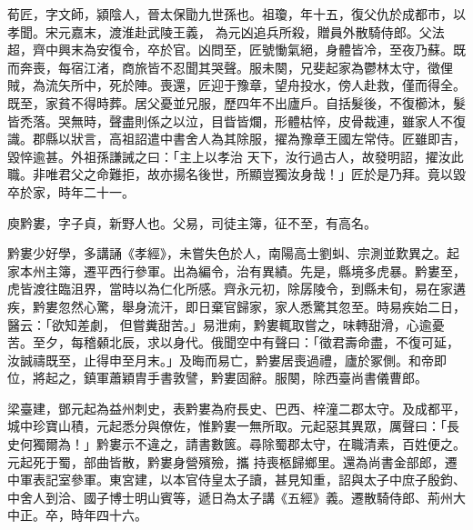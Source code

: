 \begin{pinyinscope}
 荀匠，字文師，潁陰人，晉太保勖九世孫也。祖瓊，年十五，復父仇於成都市，以孝聞。宋元嘉末，渡淮赴武陵王義，
 為元凶追兵所殺，贈員外散騎侍郎。父法超，齊中興末為安復令，卒於官。凶問至，匠號慟氣絕，身體皆冷，至夜乃蘇。既而奔喪，每宿江渚，商旅皆不忍聞其哭聲。服未闋，兄斐起家為鬱林太守，徵俚賊，為流矢所中，死於陣。喪還，匠迎于豫章，望舟投水，傍人赴救，僅而得全。既至，家貧不得時葬。居父憂並兄服，歷四年不出廬戶。自括髮後，不復櫛沐，髮皆禿落。哭無時，聲盡則係之以泣，目眥皆爛，形體枯悴，皮骨裁連，雖家人不復識。郡縣以狀言，高祖詔遣中書舍人為其除服，擢為豫章王國左常侍。匠雖即吉，毀悴逾甚。外祖孫謙誡之曰：「主上以孝治
 天下，汝行過古人，故發明詔，擢汝此職。非唯君父之命難拒，故亦揚名後世，所顯豈獨汝身哉！」匠於是乃拜。竟以毀卒於家，時年二十一。



 庾黔婁，字子貞，新野人也。父易，司徒主簿，征不至，有高名。



 黔婁少好學，多講誦《孝經》，未嘗失色於人，南陽高士劉虯、宗測並歎異之。起家本州主簿，遷平西行參軍。出為編令，治有異績。先是，縣境多虎暴。黔婁至，虎皆渡往臨沮界，當時以為仁化所感。齊永元初，除孱陵令，到縣未旬，易在家遘疾，黔婁忽然心驚，舉身流汗，即日棄官歸家，家人悉驚其忽至。時易疾始二日，醫云：「欲知差劇，
 但嘗糞甜苦。」易泄痢，黔婁輒取嘗之，味轉甜滑，心逾憂苦。至夕，每稽顙北辰，求以身代。俄聞空中有聲曰：「徵君壽命盡，不復可延，汝誠禱既至，止得申至月末。」及晦而易亡，黔婁居喪過禮，廬於冢側。和帝即位，將起之，鎮軍蕭穎胄手書敦譬，黔婁固辭。服闋，除西臺尚書儀曹郎。



 梁臺建，鄧元起為益州刺史，表黔婁為府長史、巴西、梓潼二郡太守。及成都平，城中珍寶山積，元起悉分與僚佐，惟黔婁一無所取。元起惡其異眾，厲聲曰：「長史何獨爾為！」黔婁示不違之，請書數篋。尋除蜀郡太守，在職清素，百姓便之。元起死于蜀，部曲皆散，黔婁身營殯殮，攜
 持喪柩歸鄉里。還為尚書金部郎，遷中軍表記室參軍。東宮建，以本官侍皇太子讀，甚見知重，詔與太子中庶子殷鈞、中舍人到洽、國子博士明山賓等，遞日為太子講《五經》義。遷散騎侍郎、荊州大中正。卒，時年四十六。




\end{pinyinscope}
